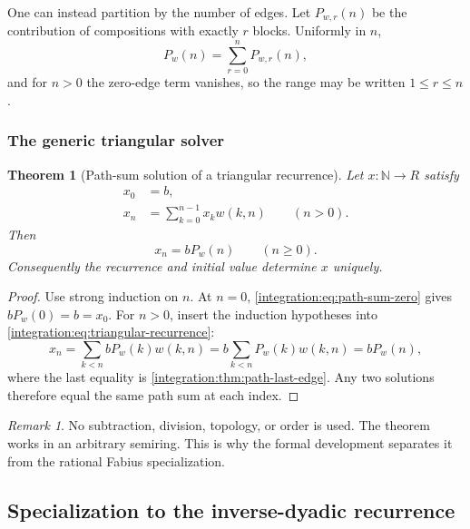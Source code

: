 \documentclass[11pt,oneside]{article}
\newtheorem{theorem}{Theorem}[section]
\theoremstyle{definition}
\theoremstyle{remark}
\newtheorem{remark}[remark]{Remark}
\newcommand{\N}{\mathbb N}
\begin{document}
One can instead partition by the number of edges.  Let $P_{w,r}(n)$ be the contribution of
compositions with exactly $r$ blocks.  Uniformly in $n$,
\begin{equation}
 P_w(n)=\sum_{r=0}^{n}P_{w,r}(n),
 \label{integration:eq:path-length-uniform}
\end{equation}
and for $n>0$ the zero-edge term vanishes, so the range may be written $1\le r\le n$.

\subsubsection{The generic triangular solver}

\begin{theorem}[Path-sum solution of a triangular recurrence]
\label{integration:thm:triangular-path-solver}
Let $x:\N\to R$ satisfy
\begin{align}
 x_0&=b,                                                    \label{integration:eq:triangular-initial}\\
 x_n&=\sum_{k=0}^{n-1}x_k w(k,n)\qquad(n>0).               \label{integration:eq:triangular-recurrence}
\end{align}
Then
\begin{equation}
 x_n=bP_w(n)
 \qquad(n\ge0).
 \label{integration:eq:triangular-path-solution}
\end{equation}
Consequently the recurrence and initial value determine $x$ uniquely.
\end{theorem}

\begin{proof}
Use strong induction on $n$.  At $n=0$, \eqref{integration:eq:path-sum-zero} gives
$bP_w(0)=b=x_0$.  For $n>0$, insert the induction hypotheses into
\eqref{integration:eq:triangular-recurrence}:
\[
 x_n=\sum_{k<n}bP_w(k)w(k,n)
 =b\sum_{k<n}P_w(k)w(k,n)
 =bP_w(n),
\]
where the last equality is \cref{integration:thm:path-last-edge}.  Any two solutions therefore equal the
same path sum at each index.
\end{proof}

\begin{remark}
No subtraction, division, topology, or order is used.  The theorem works in an arbitrary
semiring.  This is why the formal development separates it from the rational Fabius
specialization.
\end{remark}

\subsection{Specialization to the inverse-dyadic recurrence}
\label{integration:sec:fabius-composition-formula}
\end{document}
